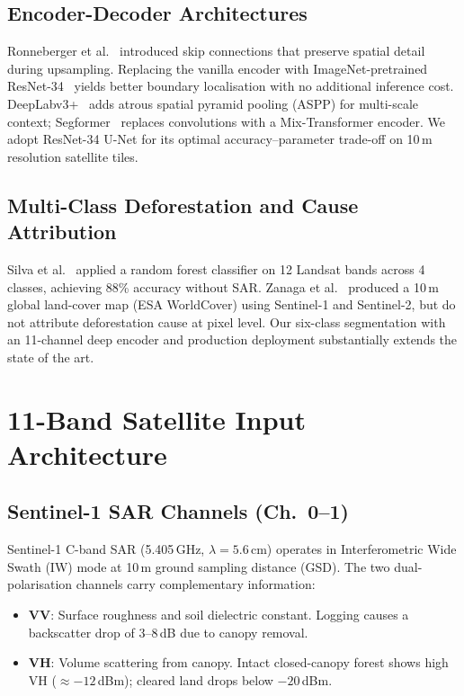 \documentclass[10pt,conference]{IEEEtran}
\begin{document}
\subsection{Encoder-Decoder Architectures}
Ronneberger et al.~\cite{ronneberger2015unet} introduced skip connections that
preserve spatial detail during upsampling. Replacing the vanilla encoder with
ImageNet-pretrained ResNet-34~\cite{he2016deep} yields better boundary
localisation with no additional inference cost. DeepLabv3+~\cite{chen2018encoderdecoder}
adds atrous spatial pyramid pooling (ASPP) for multi-scale context; Segformer~\cite{xie2021segformer}
replaces convolutions with a Mix-Transformer encoder. We adopt ResNet-34 U-Net
for its optimal accuracy--parameter trade-off on 10\,m resolution satellite tiles.

\subsection{Multi-Class Deforestation and Cause Attribution}
Silva et al.~\cite{silva2021mapping} applied a random forest classifier on 12
Landsat bands across 4 classes, achieving 88\% accuracy without SAR. Zanaga et
al.~\cite{zanaga2022esa} produced a 10\,m global land-cover map (ESA WorldCover)
using Sentinel-1 and Sentinel-2, but do not attribute deforestation cause at
pixel level. Our six-class segmentation with an 11-channel deep encoder and
production deployment substantially extends the state of the art.

\section{11-Band Satellite Input Architecture}
\label{sec:data}

\subsection{Sentinel-1 SAR Channels (Ch.\ 0--1)}

Sentinel-1 C-band SAR (5.405\,GHz, $\lambda{=}5.6$\,cm) operates in
Interferometric Wide Swath (IW) mode at 10\,m ground sampling distance (GSD).
The two dual-polarisation channels carry complementary information:

\begin{itemize}[topsep=2pt,itemsep=1pt]
  \item \textbf{VV}: Surface roughness and soil dielectric constant. Logging
        causes a backscatter drop of 3--8\,dB due to canopy removal.
  \item \textbf{VH}: Volume scattering from canopy. Intact closed-canopy forest
        shows high VH ($\approx{-}12$\,dBm); cleared land drops below $-20$\,dBm.
\end{itemize}
\end{document}
